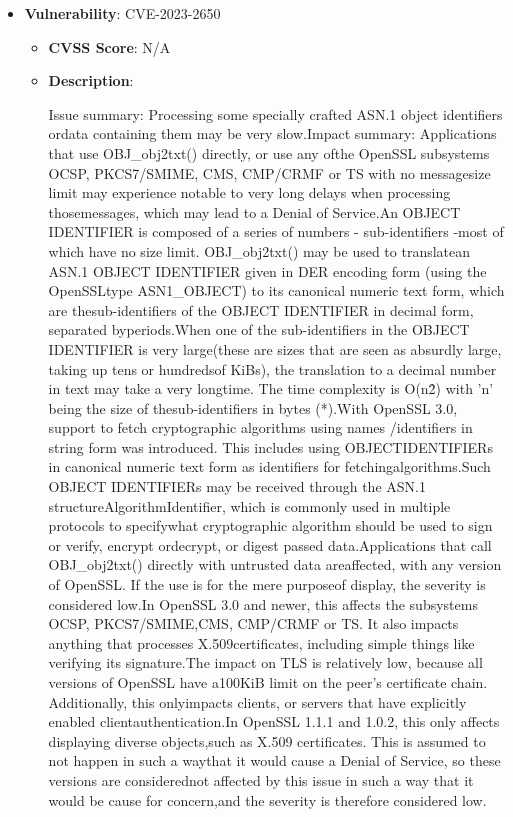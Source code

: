 \documentclass{article}
\begin{document}
\begin{itemize}
        \item \textbf{Vulnerability}: CVE-2023-2650
        \begin{itemize}
            \item \textbf{CVSS Score}:  N/A 
            \item \textbf{Description}:
            \parbox[t]{0.9\linewidth}{
                \ttfamily Issue summary: Processing some specially crafted ASN.1 object identifiers ordata containing them may be very slow.Impact summary: Applications that use OBJ\_obj2txt() directly, or use any ofthe OpenSSL subsystems OCSP, PKCS7/SMIME, CMS, CMP/CRMF or TS with no messagesize limit may experience notable to very long delays when processing thosemessages, which may lead to a Denial of Service.An OBJECT IDENTIFIER is composed of a series of numbers - sub-identifiers -most of which have no size limit.  OBJ\_obj2txt() may be used to translatean ASN.1 OBJECT IDENTIFIER given in DER encoding form (using the OpenSSLtype ASN1\_OBJECT) to its canonical numeric text form, which are thesub-identifiers of the OBJECT IDENTIFIER in decimal form, separated byperiods.When one of the sub-identifiers in the OBJECT IDENTIFIER is very large(these are sizes that are seen as absurdly large, taking up tens or hundredsof KiBs), the translation to a decimal number in text may take a very longtime.  The time complexity is O(n\^2) with 'n' being the size of thesub-identifiers in bytes (*).With OpenSSL 3.0, support to fetch cryptographic algorithms using names /identifiers in string form was introduced.  This includes using OBJECTIDENTIFIERs in canonical numeric text form as identifiers for fetchingalgorithms.Such OBJECT IDENTIFIERs may be received through the ASN.1 structureAlgorithmIdentifier, which is commonly used in multiple protocols to specifywhat cryptographic algorithm should be used to sign or verify, encrypt ordecrypt, or digest passed data.Applications that call OBJ\_obj2txt() directly with untrusted data areaffected, with any version of OpenSSL.  If the use is for the mere purposeof display, the severity is considered low.In OpenSSL 3.0 and newer, this affects the subsystems OCSP, PKCS7/SMIME,CMS, CMP/CRMF or TS.  It also impacts anything that processes X.509certificates, including simple things like verifying its signature.The impact on TLS is relatively low, because all versions of OpenSSL have a100KiB limit on the peer's certificate chain.  Additionally, this onlyimpacts clients, or servers that have explicitly enabled clientauthentication.In OpenSSL 1.1.1 and 1.0.2, this only affects displaying diverse objects,such as X.509 certificates.  This is assumed to not happen in such a waythat it would cause a Denial of Service, so these versions are considerednot affected by this issue in such a way that it would be cause for concern,and the severity is therefore considered low.
            }
        \end{itemize}
    

\end{itemize}
\end{document}
